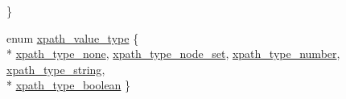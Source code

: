 \begin{DoxyCompactItemize}
 \}
\item 
enum \hyperlink{namespacepugi_ae3820874caf240e9f311bfd2790a84d6}{xpath\-\_\-value\-\_\-type} \{ \\*
\hyperlink{namespacepugi_ae3820874caf240e9f311bfd2790a84d6aaa768b8302ccc893f3cc9ba799360a77}{xpath\-\_\-type\-\_\-none}, 
\hyperlink{namespacepugi_ae3820874caf240e9f311bfd2790a84d6af5613748204e2e4861524e7d63a699c9}{xpath\-\_\-type\-\_\-node\-\_\-set}, 
\hyperlink{namespacepugi_ae3820874caf240e9f311bfd2790a84d6a02959f74f4fe93d71a1e109a45f23825}{xpath\-\_\-type\-\_\-number}, 
\hyperlink{namespacepugi_ae3820874caf240e9f311bfd2790a84d6ade2b17f4d9fad5bfb1617bf5012cf5ad}{xpath\-\_\-type\-\_\-string}, 
\\*
\hyperlink{namespacepugi_ae3820874caf240e9f311bfd2790a84d6a049dd1494237a55f8aba3392d12a0164}{xpath\-\_\-type\-\_\-boolean}
 \}
\end{DoxyCompactItemize}
